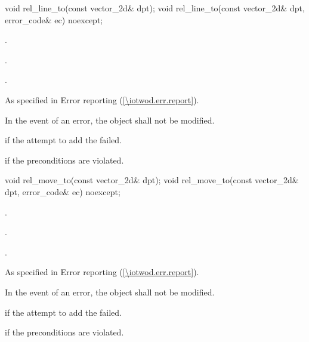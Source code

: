 \begin{itemdecl}
    void rel_line_to(const vector_2d& dpt);
    void rel_line_to(const vector_2d& dpt, error_code& ec) noexcept;
\end{itemdecl}
\begin{itemdescr}
	\pnum
	\preconditions
	.

	\pnum
	\effects
	.
	
	\pnum
	.
	
	\pnum
	\throws
	As specified in Error reporting (\ref{\iotwod.err.report}).

	\pnum
	\remarks
	In the event of an error, the object shall not be modified.

	\pnum
	\errors
	 if the attempt to add the  failed.
	
	\pnum
	 if the preconditions are violated.
	
\end{itemdescr}

\begin{itemdecl}
    void rel_move_to(const vector_2d& dpt);
    void rel_move_to(const vector_2d& dpt, error_code& ec) noexcept;
\end{itemdecl}
\begin{itemdescr}
	\pnum
	\preconditions
	.

	\pnum
	\effects
	.
	
	\pnum
	.
	
	\pnum
	\throws
	As specified in Error reporting (\ref{\iotwod.err.report}).

	\pnum
	\remarks
	In the event of an error, the object shall not be modified.

	\pnum
	\errors
	 if the attempt to add the  failed.
	
	\pnum
	 if the preconditions are violated.
	
\end{itemdescr}

